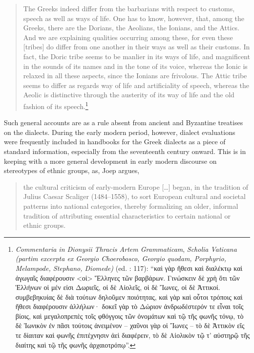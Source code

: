 \begin{quote}
The Greeks indeed differ from the barbarians with respect to customs, speech as well as ways of life. One has to know, however, that, among the Greeks, there are the Dorians, the Aeolians, the Ionians, and the Attics. And we are explaining qualities occurring among these, for even these [tribes] do differ from one another in their ways as well as their customs. In fact, the Doric tribe seems to be manlier in its ways of life, and magnificent in the sounds of its names and in the tone of its voice, whereas the Ionic is relaxed in all these aspects, since the Ionians are frivolous. The Attic tribe seems to differ as regards way of life and artificiality of speech, whereas the Aeolic is distinctive through the austerity of its way of life and the old fashion of its speech.\footnote{%
  \textit{Commentaria in Dionysii Thracis Artem Grammaticam}, \textit{Scholia Vaticana (partim excerpta ex Georgio Choerobosco, Georgio quodam, Porphyrio, Melampode, Stephano, Diomede)} (ed. \citealt{Hilgard1901}: 117): 
  “καὶ γὰρ ἤθεσι καὶ διαλέκτῳ καὶ ἀγωγαῖς διαφέρουσιν <οἱ> Ἕλληνες τῶν βαρβάρων. Γινώσκειν δὲ χρὴ ὅτι τῶν Ἑλλήνων οἱ μέν εἰσι Δωριεῖς, οἱ δὲ Αἰολεῖς, οἱ δὲ Ἴωνες, οἱ δὲ Ἀττικοί. συμβεβηκυίας δὲ διὰ τούτων δηλοῦμεν ποιότητας, καὶ γὰρ καὶ οὗτοι τρόποις καὶ ἤθεσι διαφέρουσιν ἀλλήλων· δοκεῖ γὰρ τὸ Δώριον ἀνδρωδέστερόν τε εἶναι τοῖς βίοις, καὶ μεγαλοπρεπὲς τοῖς φθόγγοις τῶν ὀνομάτων καὶ τῷ τῆς φωνῆς τόνῳ, τὸ δὲ Ἰωνικὸν ἐν πᾶσι τούτοις ἀνειμένον – χαῦνοι γὰρ οἱ Ἴωνες – τὸ δὲ Ἀττικὸν εἴς τε δίαιταν καὶ φωνῆς ἐπιτέχνησιν ἀεὶ διαφέρειν, τὸ δὲ Αἰολικὸν τῷ τ’ αὐστηρῷ τῆς διαίτης καὶ τῷ τῆς φωνῆς ἀρχαιοτρόπῳ”.}
\end{quote}

Such general accounts are as a rule absent from ancient and Byzantine treatises on the dialects. During the early modern period, however, dialect evaluations were frequently included in handbooks for the Greek dialects as a piece of standard information, especially from the seventeenth century onward. This is in keeping with a more general development in early modern discourse on stereotypes of ethnic groups, as, Joep \citet[17]{Leerssen2007} argues,

\begin{quote}
the cultural criticism of early-modern Europe […] began, in the tradition of Julius Caesar Scaliger (1484–1558), to sort European cultural and societal patterns into national categories, thereby formalizing an older, informal tradition of attributing essential characteristics to certain national or ethnic groups.
\end{quote}

